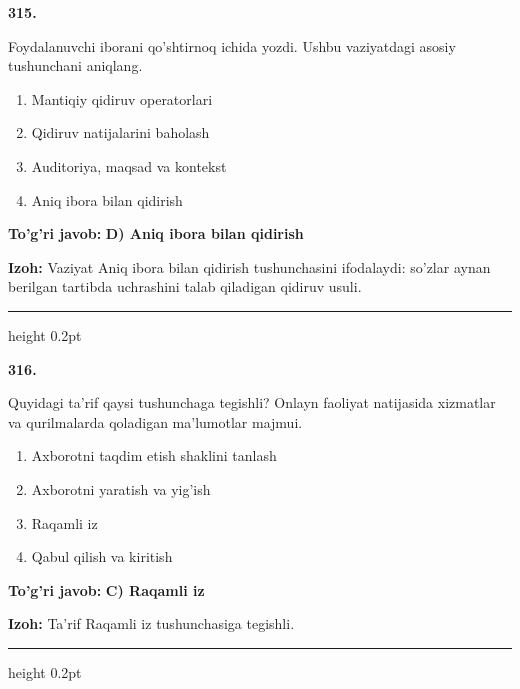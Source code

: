 \documentclass[10pt,a4paper,oneside]{article}
\begin{document}
\noindent\textbf{\color{ink}315.}
\par
Foydalanuvchi iborani qo'shtirnoq ichida yozdi. Ushbu vaziyatdagi asosiy tushunchani aniqlang.
\begin{enumerate}[label=\Alph*),leftmargin=9mm]
\item Mantiqiy qidiruv operatorlari
\item Qidiruv natijalarini baholash
\item Auditoriya, maqsad va kontekst
\item Aniq ibora bilan qidirish
\end{enumerate}
\begin{tcolorbox}[enhanced,breakable,colback=teal!4,colframe=teal!50!black,boxrule=0.5pt,arc=1.1mm,left=3mm,right=3mm,top=1.7mm,bottom=1.7mm,before skip=2mm,after skip=2mm]
\textbf{\color{teal}To'g'ri javob:} \textbf{D) Aniq ibora bilan qidirish}
\par\smallskip
\textbf{Izoh:} Vaziyat Aniq ibora bilan qidirish tushunchasini ifodalaydi: so'zlar aynan berilgan tartibda uchrashini talab qiladigan qidiruv usuli.
\end{tcolorbox}
\vspace{2mm}\hrule height 0.2pt \vspace{3mm}

\noindent\textbf{\color{ink}316.}
\par
Quyidagi ta'rif qaysi tushunchaga tegishli? Onlayn faoliyat natijasida xizmatlar va qurilmalarda qoladigan ma'lumotlar majmui.
\begin{enumerate}[label=\Alph*),leftmargin=9mm]
\item Axborotni taqdim etish shaklini tanlash
\item Axborotni yaratish va yig'ish
\item Raqamli iz
\item Qabul qilish va kiritish
\end{enumerate}
\begin{tcolorbox}[enhanced,breakable,colback=teal!4,colframe=teal!50!black,boxrule=0.5pt,arc=1.1mm,left=3mm,right=3mm,top=1.7mm,bottom=1.7mm,before skip=2mm,after skip=2mm]
\textbf{\color{teal}To'g'ri javob:} \textbf{C) Raqamli iz}
\par\smallskip
\textbf{Izoh:} Ta'rif Raqamli iz tushunchasiga tegishli.
\end{tcolorbox}
\vspace{2mm}\hrule height 0.2pt \vspace{3mm}
\end{document}
